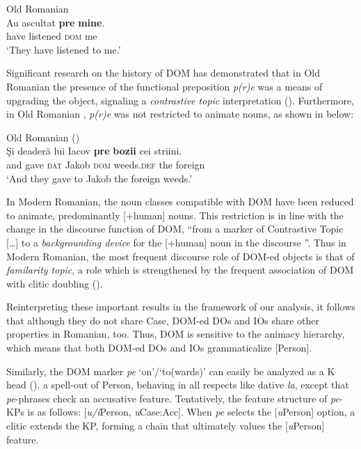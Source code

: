 \documentclass[output=paper,colorlinks,citecolor=brown,nonflat]{langsci/langscibook}
\begin{document}
\ea%
      \label{ex:cornilescu:19}
      Old Romanian \citep[395]{HillMardale2017}\\
      \gll Au  ascultat	\textbf{pre} \textbf{mine}.\\
            have listened \textsc{dom} me\\
      \glt ‘They have listened to me.’
      \z



Significant research on the history of DOM has demonstrated that in Old Romanian  the presence of the functional preposition \textit{p(r)e} was a means of upgrading the object, signaling a \textit{contrastive topic} interpretation (\citealt{Hill2013, HillMardale2017}). Furthermore, in Old Romanian , \textit{p(r)e} was not restricted to animate nouns, as shown in  below:

\ea%
      \label{ex:cornilescu:20}
      Old Romanian  (\citealt[396]{HillMardale2017}) \\
      \gll  Şi deaderă lui Iacov \textbf{pre} \textbf{bozii} cei striini.\\
             and gave \textsc{dat} Jakob \textsc{dom} weeds.\textsc{def} the foreign\\
      \glt ‘And they gave to Jakob the foreign weeds.’
      \z

In Modern Romanian, the noun classes compatible with DOM have been reduced to animate, predominantly [+human] nouns. This restriction is in line with the change in the discourse function of DOM, “from a marker of Contrastive Topic […] to a \textit{backgrounding device} for the [+human] noun in the discourse \citep[147]{Hill2013}”. Thus in Modern Romanian, the most frequent discourse role of DOM-ed objects is that of \textit{familarity topic}, a role which is strengthened by the frequent association of DOM with clitic doubling (\citealt{HillMardale2017}).

Reinterpreting these important results in the framework of our analysis, it follows that although they do not share Case, DOM-ed DOs and IOs share other properties in Romanian, too. Thus, DOM is sensitive to the animacy hierarchy, which means that both DOM-ed DOs and IOs grammaticalize [Person].

Similarly, the DOM marker \textit{pe} ‘on’/‘to(wards)’ can easily be analyzed as a K head (\citealt{López2012, HillMardale2017}), a spell-out of Person, behaving in all respects like dative \textit{la}, except that \textit{pe}{}-phrases check an accusative feature. Tentatively, the feature structure of \textit{pe}-KPs is as follows: [\textit{u/i}Person, \textit{u}Case:Acc]. When \textit{pe} selects the [\textit{u}Person] option, a clitic extends the KP, forming a chain that ultimately values the [\textit{u}Person] feature.
\end{document}
